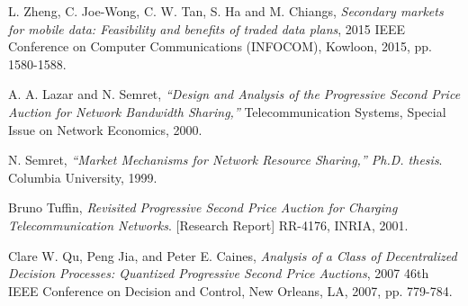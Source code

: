 \documentclass[12pt]{article}
\theoremstyle{definition}
\begin{document}
\begin{thebibliography}{9}

L. Zheng, C. Joe-Wong, C. W. Tan, S. Ha and M. Chiangs, 
\textit{Secondary markets for mobile data: Feasibility and benefits of traded
data plans}, 2015 IEEE
Conference on Computer Communications (INFOCOM), Kowloon, 2015, pp. 1580-1588.

A. A. Lazar and N. Semret, 
\textit{“Design and Analysis of the Progressive Second Price Auction for Network
Bandwidth Sharing,”} Telecommunication Systems, Special Issue on Network Economics, 2000.

N. Semret, 
\textit{“Market Mechanisms for Network Resource Sharing,”
Ph.D. thesis}. 
Columbia University, 1999.

Bruno Tuffin,
\textit{Revisited Progressive Second Price Auction for Charging
Telecommunication Networks}.
[Research Report] RR-4176, INRIA, 2001.

Clare W. Qu, Peng Jia, and Peter E. Caines,
\textit{Analysis of a Class of Decentralized Decision Processes: Quantized
Progressive Second Price Auctions},
2007 46th IEEE Conference on Decision and Control, New Orleans, LA, 2007, pp.
779-784.

 
\end{thebibliography}
\end{document}
